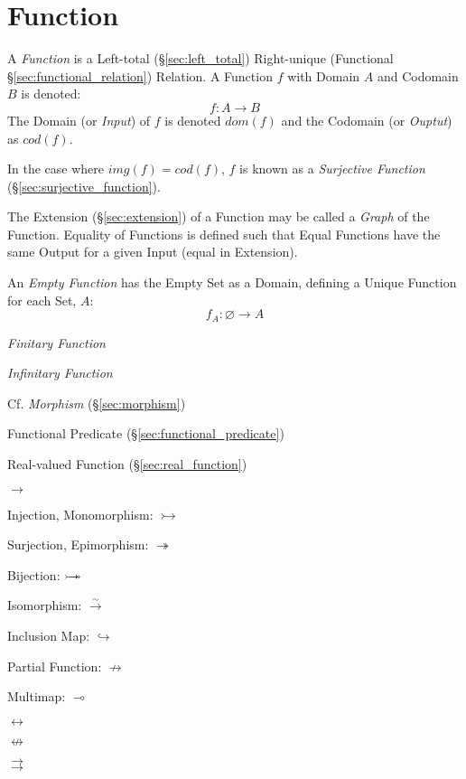 \section{Function}\label{sec:set_function}

A \emph{Function} is a Left-total (\S\ref{sec:left_total})
Right-unique (Functional \S\ref{sec:functional_relation}) Relation. A
Function $f$ with Domain $A$ and Codomain $B$ is denoted:
\[
  f : A \rightarrow B
\]
The Domain (or \emph{Input}) of $f$ is denoted $dom(f)$ and the
Codomain (or \emph{Ouptut}) as $cod(f)$.

In the case where $img(f) = cod(f)$, $f$ is known as a
\emph{Surjective Function} (\S\ref{sec:surjective_function}).

The Extension (\S\ref{sec:extension}) of a Function may be called a
\emph{Graph} of the Function. Equality of Functions is defined such
that Equal Functions have the same Output for a given Input (equal in
Extension).

An \emph{Empty Function} has the Empty Set as a Domain, defining a
Unique Function for each Set, $A$:
\[
  f_A : \varnothing \rightarrow A
\]

\emph{Finitary Function}

\emph{Infinitary Function}

\HandRight\; Cf. \emph{Morphism} (\S\ref{sec:morphism})

Functional Predicate (\S\ref{sec:functional_predicate})

Real-valued Function (\S\ref{sec:real_function})

$\rightarrow$

Injection, Monomorphism: $\rightarrowtail$

Surjection, Epimorphism: $\twoheadrightarrow$

Bijection: $\rightarrowtail \hspace{-8pt} \twoheadrightarrow$

Isomorphism: $\xrightarrow{\sim}$

Inclusion Map: $\hookrightarrow$

Partial Function: $\nrightarrow$

Multimap: $\multimap$

$\leftrightarrow$

$\nleftrightarrow$

$\rightrightarrows$

